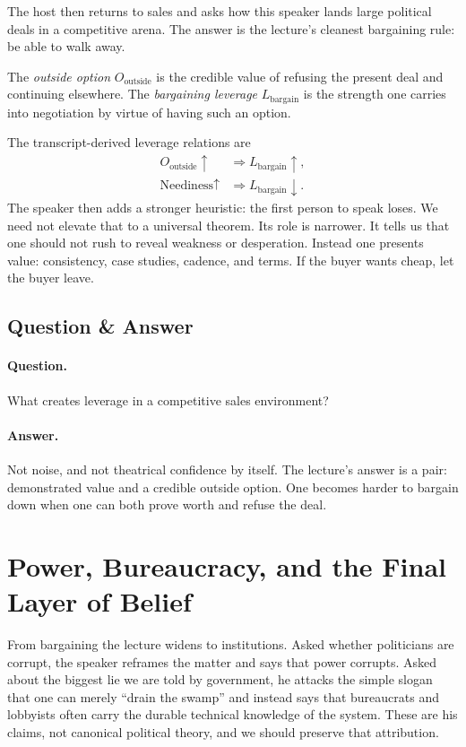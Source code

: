 The host then returns to sales and asks how this speaker lands large political deals in a competitive arena. The answer is the lecture's cleanest bargaining rule: be able to walk away.

\begin{definition}
The \emph{outside option} \(O_{\text{outside}}\) is the credible value of refusing the present deal and continuing elsewhere. The \emph{bargaining leverage} \(L_{\text{bargain}}\) is the strength one carries into negotiation by virtue of having such an option.
\end{definition}

The transcript-derived leverage relations are
\begin{align}
O_{\text{outside}} \uparrow &\Rightarrow L_{\text{bargain}} \uparrow,\\
\text{Neediness} \uparrow &\Rightarrow L_{\text{bargain}} \downarrow.
\end{align}
The speaker then adds a stronger heuristic: the first person to speak loses. We need not elevate that to a universal theorem. Its role is narrower. It tells us that one should not rush to reveal weakness or desperation. Instead one presents value: consistency, case studies, cadence, and terms. If the buyer wants cheap, let the buyer leave.

\subsection{Question \& Answer}

\paragraph{Question.} What creates leverage in a competitive sales environment?

\paragraph{Answer.} Not noise, and not theatrical confidence by itself. The lecture's answer is a pair: demonstrated value and a credible outside option. One becomes harder to bargain down when one can both prove worth and refuse the deal.

\section{Power, Bureaucracy, and the Final Layer of Belief}

From bargaining the lecture widens to institutions. Asked whether politicians are corrupt, the speaker reframes the matter and says that power corrupts. Asked about the biggest lie we are told by government, he attacks the simple slogan that one can merely ``drain the swamp'' and instead says that bureaucrats and lobbyists often carry the durable technical knowledge of the system. These are his claims, not canonical political theory, and we should preserve that attribution.

